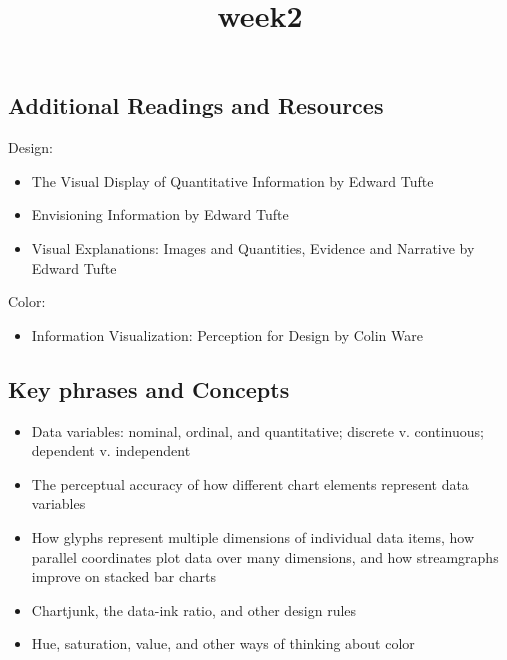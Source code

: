 \documentclass[11pt]{article}
\title{week2}
\providecommand{\tightlist}{%
      \setlength{\itemsep}{0pt}\setlength{\parskip}{0pt}}
\begin{document}
    
    
    \maketitle
    
    

    
    \subsection{Additional Readings and
Resources}\label{additional-readings-and-resources}

Design:

\begin{itemize}
\tightlist
\item
  The Visual Display of Quantitative Information by Edward Tufte
\item
  Envisioning Information by Edward Tufte
\item
  Visual Explanations: Images and Quantities, Evidence and Narrative by
  Edward Tufte
\end{itemize}

Color:

\begin{itemize}
\tightlist
\item
  Information Visualization: Perception for Design by Colin Ware
\end{itemize}

    \subsection{Key phrases and Concepts}\label{key-phrases-and-concepts}

\begin{itemize}
\tightlist
\item
  Data variables: nominal, ordinal, and quantitative; discrete v.
  continuous; dependent v. independent
\item
  The perceptual accuracy of how different chart elements represent data
  variables
\item
  How glyphs represent multiple dimensions of individual data items, how
  parallel coordinates plot data over many dimensions, and how
  streamgraphs improve on stacked bar charts
\item
  Chartjunk, the data-ink ratio, and other design rules
\item
  Hue, saturation, value, and other ways of thinking about color
\end{itemize}
\end{document}
